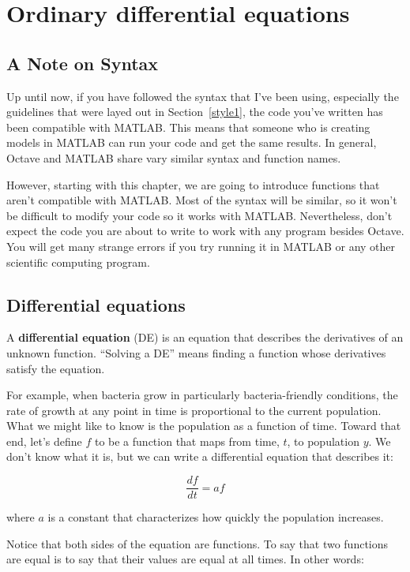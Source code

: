 
\chapter{Ordinary differential equations}

\section{A Note on Syntax}

Up until now, if you have followed the syntax that I've been using, especially
the guidelines that were layed out in Section~\ref{style1}, the code you've
written has been compatible with MATLAB. This means that someone who is
creating models in MATLAB can run your code and get the same results. In
general, Octave and MATLAB share vary similar syntax and function names.

However, starting with this chapter, we are going to introduce functions that
aren't compatible with MATLAB. Most of the syntax will be similar, so it won't
be difficult to modify your
code so it works with MATLAB. Nevertheless, don't expect the code you are about
to write to work with any program besides Octave. You will get many strange
errors if you try running it in MATLAB or any other scientific computing
program.

\section{Differential equations}

A {\bf differential equation} (DE) is an equation that describes the
derivatives of an unknown function. ``Solving a DE'' means finding a
function whose derivatives satisfy the equation.

For example, when bacteria grow in particularly bacteria-friendly
conditions, the rate of growth at any point in time is proportional to
the current population. What we might like to know is the population
as a function of time. Toward that end, let's define $f$ to be a
function that maps from time, $t$, to population $y$. We don't
know what it is, but we can write a differential equation
that describes it:

\[ \frac{df}{dt} = a f \]

where $a$ is a constant that characterizes how quickly the population
increases.

Notice that both sides of the equation are functions. To say that
two functions are equal is to say that their values are equal at
all times. In other words:

